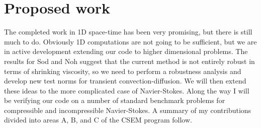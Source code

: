 \documentclass[Proposal.tex]{subfiles}
\begin{document}
\chapter{Proposed work}
The completed work in 1D space-time has been very promising, but there is still much to do. 
Obviously 1D computations are not going to be sufficient, but we are in active development extending our code
to higher dimensional problems.
The results for Sod and Noh suggest that the current method is not entirely robust in terms of shrinking viscosity,
so we need to perform a robustness analysis and develop new test norms for transient convection-diffusion.
We will then extend these ideas to the more complicated case of Navier-Stokes.
Along the way I will be verifying our code on a number of standard benchmark problems for compressible and incompressible Navier-Stokes.
A summary of my contributions divided into areas A, B, and C of the CSEM program follow.
\end{document}
